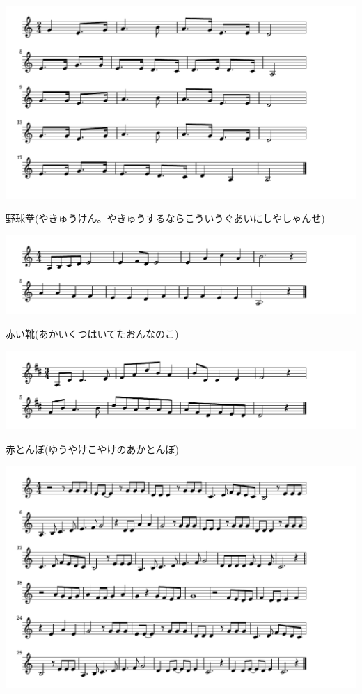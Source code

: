 \documentclass[a4paper]{ltjsarticle}
\begin{document}
\includegraphics[clip]{yakyuken_crop.pdf}

\vspace{-10mm} \hspace{10mm}
野球拳(やきゅうけん。やきゅうするならこういうぐあいにしやしゃんせ)

\includegraphics[clip]{akaikutsu_crop.pdf}

\vspace{-10mm} \hspace{10mm}
赤い靴(あかいくつはいてたおんなのこ)

\includegraphics[clip]{akatonbo_crop.pdf}

\vspace{-10mm} \hspace{10mm}
赤とんぼ(ゆうやけこやけのあかとんぼ)

\includegraphics[clip]{amaironokami_crop.pdf}
\end{document}
